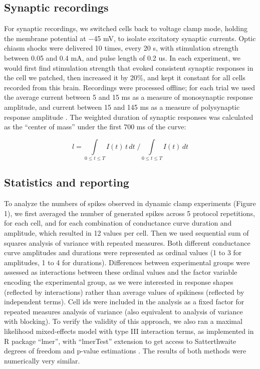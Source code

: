 \documentclass{article}
\begin{document}
\subsection*{Synaptic recordings}

For synaptic recordings, we switched cells back to voltage clamp mode, holding the membrane potential at $-$45 mV, to isolate excitatory synaptic currents. Optic chiasm shocks were delivered 10 times, every 20 s, with stimulation strength between 0.05 and 0.4 mA, and pulse length of 0.2 us. In each experiment, we would first find stimulation strength that evoked consistent synaptic responses in the cell we patched, then increased it by 20\%, and kept it constant for all cells recorded from this brain. Recordings were processed offline; for each trial we used the average current between 5 and 15 ms as a measure of monosynaptic response amplitude, and current between 15 and 145 ms as a measure of polysynaptic response amplitude \citep{ciarleglio2015}. The weighted duration of synaptic responses was calculated as the “center of mass” under the first 700 ms of the curve:

$$\displaystyle l=\int\limits_{0 \leq t \leq T}{I(t)\, t \, dt} \; \Big/ \int\limits_{0 \leq t \leq T}{I(t) \, dt}$$

\subsection*{Statistics and reporting}

To analyze the numbers of spikes observed in dynamic clamp experiments (Figure 1), we first averaged the number of generated spikes across 5 protocol repetitions, for each cell, and for each combination of conductance curve duration and amplitude, which resulted in 12 values per cell. Then we used sequential sum of squares analysis of variance with repeated measures. Both different conductance curve amplitudes and durations were represented as ordinal values (1 to 3 for amplitudes, 1 to 4 for durations). Differences between experimental groups were assessed as interactions between these ordinal values and the factor variable encoding the experimental group, as we were interested in response shapes (reflected by interactions) rather than average values of spikiness (reflected by independent terms). Cell ids were included in the analysis as a fixed factor for repeated measures analysis of variance (also equivalent to analysis of variance with blocking). To verify the validity of this approach, we also ran a maximal likelihood mixed-effects model with type III interaction terms, as implemented in R package “lmer”, with “lmerTest” extension to get access to Satterthwaite degrees of freedom and p-value estimations \citep{kuznetsova2017}. The results of both methods were numerically very similar.
\end{document}
